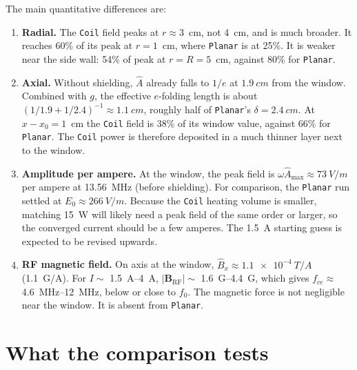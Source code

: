\documentclass[11pt,a4paper]{article}
\newcommand{\Ahat}{\hat{A}}
\newcommand{\code}[1]{\texttt{#1}}
\begin{document}
The main quantitative differences are:
\begin{enumerate}
  \item \textbf{Radial.} The \code{Coil} field peaks at $r \approx 3$~cm, not
        4~cm, and is much broader. It reaches 60\% of its peak at $r=1$~cm,
        where \code{Planar} is at 25\%. It is weaker near the side wall: 54\%
        of peak at $r=R=5$~cm, against 80\% for \code{Planar}.
  \item \textbf{Axial.} Without shielding, $\Ahat$ already falls to $1/e$ at
        $\SI{1.9}{cm}$ from the window. Combined with $g$, the effective
        $e$-folding length is about
        $(1/1.9 + 1/2.4)^{-1} \approx \SI{1.1}{cm}$, roughly half of
        \code{Planar}'s $\delta = \SI{2.4}{cm}$. At $x-x_0 = 1$~cm the
        \code{Coil} field is 38\% of its window value, against 66\% for
        \code{Planar}. The \code{Coil} power is therefore deposited in a much
        thinner layer next to the window.
  \item \textbf{Amplitude per ampere.} At the window, the peak field is
        $\omega\Ahat_{\max} \approx \SI{73}{V/m}$ per ampere at
        \SI{13.56}{MHz} (before shielding). For comparison, the
        \code{Planar} run settled at $E_0 \approx \SI{266}{V/m}$. Because the
        \code{Coil} heating volume is smaller, matching \SI{15}{W} will likely
        need a peak field of the same order or larger, so the converged
        current should be a few amperes. The \SI{1.5}{A} starting guess is
        expected to be revised upwards.
  \item \textbf{RF magnetic field.} On axis at the window,
        $\hat B_x \approx \SI{1.1e-4}{T/A}$ (\SI{1.1}{G/A}). For
        $I \sim$ \SIrange{1.5}{4}{A}, $|\mathbf B_{\mathrm{RF}}| \sim$
        \SIrange{1.6}{4.4}{G}, which gives
        $f_{ce} \approx$ \SIrange{4.6}{12}{MHz}, below or close to $f_0$.
        The magnetic force is not negligible near the window. It is absent
        from \code{Planar}.
\end{enumerate}

\section{What the comparison tests}
\end{document}

